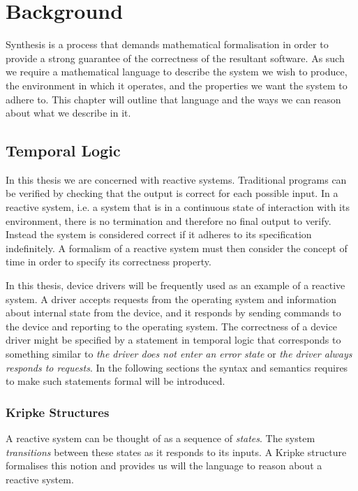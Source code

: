 \chapter{Background}

Synthesis is a process that demands mathematical formalisation in order to
provide a strong guarantee of the correctness of the resultant software. As
such we require a mathematical language to describe the system we wish to
produce, the environment in which it operates, and the properties we want the
system to adhere to. This chapter will outline that language and the ways we
can reason about what we describe in it.

\section{Temporal Logic}

In this thesis we are concerned with reactive systems. Traditional programs can be verified by checking that the output is correct for each possible input. In a reactive system, i.e. a system that is in a continuous state of interaction with its environment, there is no termination and therefore no final output to verify. Instead the system is considered correct if it adheres to its specification indefinitely. A formalism of a reactive system must then consider the concept of time in order to specify its correctness property. 

In this thesis, device drivers will be frequently used as an example of a reactive system. A driver accepts requests from the operating system and information about internal state from the device, and it responds by sending commands to the device and reporting to the operating system. The correctness of a device driver might be specified by a statement in temporal logic that corresponds to something similar to \emph{the driver does not enter an error state} or \emph{the driver always responds to requests}. In the following sections the syntax and semantics requires to make such statements formal will be introduced.

\subsection{Kripke Structures}

A reactive system can be thought of as a sequence of \emph{states}. The system
\emph{transitions} between these states as it responds to its inputs. A Kripke
structure~\cite{Kripke63} formalises this notion and provides us will the
language to reason about a reactive system.

